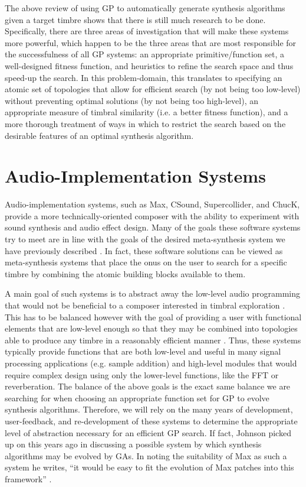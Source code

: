 \documentclass[a4paper,12pt]{report} 	%
\numberwithin{figure}{chapter}
\numberwithin{table}{chapter}
\numberwithin{equation}{chapter}
\begin{document}
\begin{flushleft}
The above review of using GP to automatically generate synthesis algorithms given a target timbre shows that there is still much research to be done. Specifically, there are three areas of investigation that will make these systems more powerful, which happen to be the three areas that are most responsible for the successfulness of all GP systems: an appropriate primitive/function set, a well-designed fitness function, and heuristics to refine the search space and thus speed-up the search. In this problem-domain, this translates to specifying an atomic set of topologies that allow for efficient search (by not being too low-level) without preventing optimal solutions (by not being too high-level), an appropriate measure of timbral similarity (i.e. a better fitness function), and a more thorough treatment of ways in which to restrict the search based on the desirable features of an optimal synthesis algorithm. 

\section{Audio-Implementation Systems}

Audio-implementation systems, such as Max, CSound, Supercollider, and ChucK, provide a more technically-oriented composer with the ability to experiment with sound synthesis and audio effect design. Many of the goals these software systems try to meet are in line with the goals of the desired meta-synthesis system we have previously described \cite{Moreno:2005bs}. In fact, these software solutions can be viewed as meta-synthesis systems that place the onus on the user to search for a specific timbre by combining the atomic building blocks available to them. 

A main goal of such systems is to abstract away the low-level audio programming that would not be beneficial to a composer interested in timbral exploration \cite[p. 1]{Moreno:2005bs}. This has to be balanced however with the goal of providing a user with functional elements that are low-level enough so that they may be combined into topologies able to produce any timbre in a reasonably efficient manner \cite[p. 1]{Moreno:2005bs}. Thus, these systems typically provide functions that are both low-level and useful in many signal processing applications (e.g. sample addition) and high-level modules that would require complex design using only the lower-level functions, like the FFT or reverberation. The balance of the above goals is the exact same balance we are searching for when choosing an appropriate function set for GP to evolve synthesis algorithms. Therefore, we will rely on the many years of development, user-feedback, and re-development of these systems to determine the appropriate level of abstraction necessary for an efficient GP search. If fact, Johnson picked up on this years ago in discussing a possible system by which synthesis algorithms may be evolved by GAs. In noting the suitability of Max as such a system he writes, ``it would be easy to fit the evolution of Max patches into this framework'' \cite[p. 6]{Johnson:1998sh}.


\end{flushleft}
\end{document}

